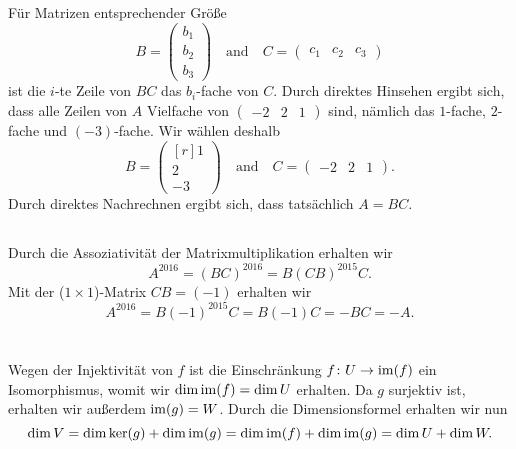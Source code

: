 \documentclass[a4paper,10pt]{article}
\begin{document}
\section{}


\subsection{}
Für Matrizen entsprechender Größe
\[
 B = \begin{pmatrix} b_1 \\ b_2 \\ b_3 \end{pmatrix}
 \quad\text{and}\quad
 C = \begin{pmatrix} c_1 & c_2 & c_3 \end{pmatrix}
\]
ist die $i$-te Zeile von $BC$ das $b_i$-fache von $C$. Durch direktes Hinsehen ergibt sich, dass alle Zeilen von $A$ Vielfache von $\begin{pmatrix} -2 & 2 & 1 \end{pmatrix}$ sind, nämlich das $1$-fache, $2$-fache und $(-3)$-fache. Wir wählen deshalb
\[
 B = \begin{pmatrix*}[r] 1 \\ 2 \\ -3 \end{pmatrix*}
 \quad\text{and}\quad
 C = \begin{pmatrix} -2 & 2 & 1 \end{pmatrix}.
\]
Durch direktes Nachrechnen ergibt sich, dass tatsächlich $A = BC$.


\subsection{}
Durch die Assoziativität der Matrixmultiplikation erhalten wir
\[
 A^{2016}
 = (BC)^{2016}
 = B (CB)^{2015} C.
\]
Mit der ($1 \times 1$)-Matrix $CB = (-1)$ erhalten wir
\[
 A^{2016}
 = B (-1)^{2015} C
 = B (-1) C
 = -BC
 = -A.
\]





\section{}
Wegen der Injektivität von $f$ ist die Einschränkung $f \colon U \to \mathrm{im}(f)$ ein Isomorphismus, womit wir $\dim \mathrm{im}(f) = \dim U$ erhalten. Da $g$ surjektiv ist, erhalten wir außerdem $\mathrm{im}(g) = W$. Durch die Dimensionsformel erhalten wir nun
\[
 \dim V
 = \dim \ker(g) + \dim \mathrm{im}(g)
 = \dim \mathrm{im}(f) + \dim \mathrm{im}(g)
 = \dim U + \dim W.
\]
\end{document}
